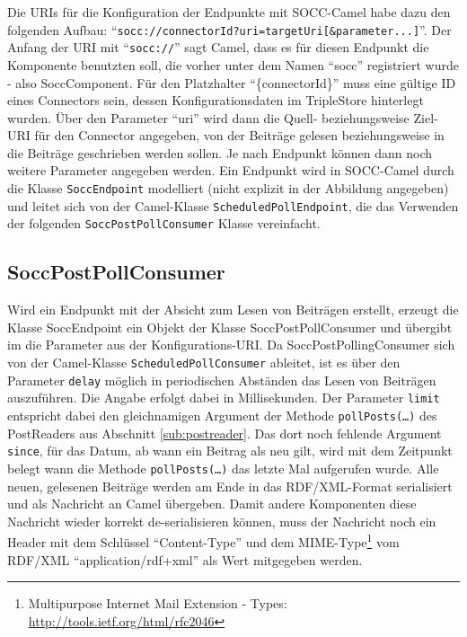 Die URIs für die Konfiguration der Endpunkte mit SOCC-Camel habe dazu den folgenden Aufbau: \enquote{\texttt{socc://{connectorId}?uri={targetUri}[\&{parameter}...]}}. Der Anfang der URI mit \enquote{\texttt{socc://}} sagt Camel, dass es für diesen Endpunkt die Komponente benutzten soll, die vorher unter dem Namen \enquote{socc} registriert wurde - also SoccComponent. Für den Platzhalter \enquote{\{connectorId\}} muss eine gültige ID eines Connectors sein, dessen Konfigurationsdaten im TripleStore hinterlegt wurden. Über den Parameter \enquote{uri} wird dann die Quell- beziehungsweise Ziel-URI für den Connector angegeben, von der Beiträge gelesen beziehungsweise in die Beiträge geschrieben werden sollen. Je nach Endpunkt können dann noch weitere Parameter angegeben werden. Ein Endpunkt wird in SOCC-Camel durch die Klasse \texttt{SoccEndpoint} modelliert (nicht explizit in der Abbildung angegeben) und leitet sich von der Camel-Klasse \texttt{ScheduledPollEndpoint}, die das Verwenden der folgenden \texttt{SoccPostPollConsumer} Klasse vereinfacht.

\subsection{SoccPostPollConsumer} %
\label{sub:soccpostpollingconsumer}

Wird ein Endpunkt mit der Absicht zum Lesen von Beiträgen erstellt, erzeugt die Klasse SoccEndpoint ein Objekt der Klasse SoccPostPollConsumer und übergibt im die Parameter aus der Konfigurations-URI. Da SoccPostPollingConsumer sich von der Camel-Klasse \texttt{ScheduledPollConsumer} ableitet, ist es über den Parameter \texttt{delay} möglich in periodischen Abständen das Lesen von Beiträgen auszuführen. Die Angabe erfolgt dabei in Millisekunden. Der Parameter \texttt{limit} entspricht dabei den gleichnamigen Argument der Methode \texttt{pollPosts(\dots)} des PostReaders aus Abschnitt \ref{sub:postreader}. Das dort noch fehlende Argument \texttt{since}, für das Datum, ab wann ein Beitrag als neu gilt, wird mit dem Zeitpunkt belegt wann die Methode \texttt{pollPosts(\dots)} das letzte Mal aufgerufen wurde. Alle neuen, gelesenen Beiträge werden am Ende in das RDF/XML-Format serialisiert und als Nachricht an Camel übergeben. Damit andere Komponenten diese Nachricht wieder korrekt de-serialisieren können, muss der Nachricht noch ein Header mit dem Schlüssel \enquote{Content-Type} und dem MIME-Type\footnote{ Multipurpose Internet Mail Extension - Types: \url{http://tools.ietf.org/html/rfc2046}} vom RDF/XML \enquote{application/rdf+xml} als Wert mitgegeben werden.

